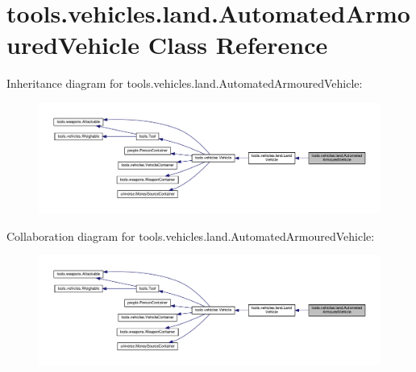 \hypertarget{classtools_1_1vehicles_1_1land_1_1_automated_armoured_vehicle}{}\section{tools.\+vehicles.\+land.\+Automated\+Armoured\+Vehicle Class Reference}
\label{classtools_1_1vehicles_1_1land_1_1_automated_armoured_vehicle}


Inheritance diagram for tools.\+vehicles.\+land.\+Automated\+Armoured\+Vehicle\+:
\nopagebreak
\begin{figure}[H]
\begin{center}
\leavevmode
\includegraphics[width=350pt]{classtools_1_1vehicles_1_1land_1_1_automated_armoured_vehicle__inherit__graph}
\end{center}
\end{figure}


Collaboration diagram for tools.\+vehicles.\+land.\+Automated\+Armoured\+Vehicle\+:
\nopagebreak
\begin{figure}[H]
\begin{center}
\leavevmode
\includegraphics[width=350pt]{classtools_1_1vehicles_1_1land_1_1_automated_armoured_vehicle__coll__graph}
\end{center}
\end{figure}
